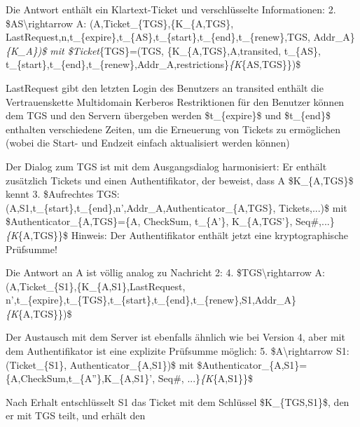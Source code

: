 \documentclass[a4paper]{article}
\begin{document}
\begin{multicols}{3}
\begin{itemize*}
            \item Die Antwort enthält ein Klartext-Ticket und verschlüsselte
            Informationen: 2. \$AS\textbackslash rightarrow A:
            (A,Ticket\_\{TGS\},\{K\_\{A,TGS\},
            LastRequest,n,t\_\{expire\},t\_\{AS\},t\_\{start\},t\_\{end\},t\_\{renew\},TGS,
            Addr\_A\}\emph{\{K\_A\})\$ mit \$Ticket}\{TGS\}=(TGS,
            \{K\_\{A,TGS\},A,transited, t\_\{AS\},
            t\_\{start\},t\_\{end\},t\_\{renew\},Addr\_A,restrictions\}\emph{\{K}\{AS,TGS\}\})\$
            \begin{itemize*}
                  \item LastRequest gibt den letzten Login des Benutzers an transited enthält die Vertrauenskette Multidomain Kerberos Restriktionen für den Benutzer können dem TGS und den Servern übergeben werden \$t\_\{expire\}\$ und \$t\_\{end\}\$ enthalten verschiedene Zeiten, um die Erneuerung von Tickets zu ermöglichen (wobei die Start- und Endzeit einfach aktualisiert werden können)
            \end{itemize*}
            \item Der Dialog zum TGS ist mit dem Ausgangsdialog harmonisiert: Er enthält
            zusätzlich Tickets und einen Authentifikator, der beweist, dass A
            \$K\_\{A,TGS\}\$ kennt 3. \$Aufrechtes
            TGS:(A,S1,t\_\{start\},t\_\{end\},n',Addr\_A,Authenticator\_\{A,TGS\},
            Tickets,...)\$ mit \$Authenticator\_\{A,TGS\}=\{A, CheckSum,
            t\_\{A'\}, K\_\{A,TGS'\}, Seq\#,...\}\emph{\{K}\{A,TGS\}\}\$ Hinweis:
            Der Authentifikator enthält jetzt eine kryptographische Prüfsumme!
            \item Die Antwort an A ist völlig analog zu Nachricht 2: 4.
            \$TGS\textbackslash rightarrow
            A:(A,Ticket\_\{S1\},\{K\_\{A,S1\},LastRequest,
            n',t\_\{expire\},t\_\{TGS\},t\_\{start\},t\_\{end\},t\_\{renew\},S1,Addr\_A\}\emph{\{K}\{A,TGS\}\})\$
            \item Der Austausch mit dem Server ist ebenfalls ähnlich wie bei Version 4,
            aber mit dem Authentifikator ist eine explizite Prüfsumme möglich: 5.
            \$A\textbackslash rightarrow S1:(Ticket\_\{S1\},
            Authenticator\_\{A,S1\})\$ mit
            \$Authenticator\_\{A,S1\}=\{A,CheckSum,t\_\{A''\},K\_\{A,S1\}', Seq\#,
            ...\}\emph{\{K}\{A,S1\}\}\$
            \item Nach Erhalt entschlüsselt S1 das Ticket mit dem Schlüssel
            \$K\_\{TGS,S1\}\$, den er mit TGS teilt, und erhält den

\end{itemize*}
\end{multicols}
\end{document}
